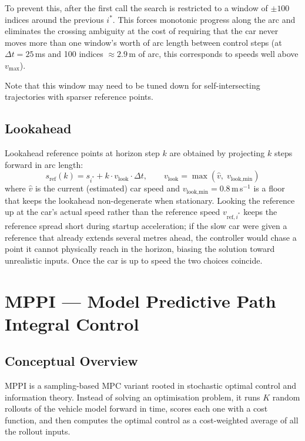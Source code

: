 \documentclass[11pt]{article}
\begin{document}
To prevent this, after the first call the search is restricted to a window of
$\pm 100$ indices around the previous $i^*$.  This forces monotonic progress
along the arc and eliminates the crossing ambiguity at the cost of requiring
that the car never moves more than one window's worth of arc length between
control steps (at $\Delta t = 25$\,ms and 100 indices $\approx 2.9$\,m of arc,
this corresponds to speeds well above $v_{\max}$).

Note that this window may need to be tuned down for self-intersecting trajectories with sparser reference points.

\subsection{Lookahead}

Lookahead reference points at horizon step $k$ are obtained by projecting $k$
steps forward in arc length:
\[
s_{\text{ref}}(k) = s_{i^*} + k \cdot v_{\text{look}} \cdot \Delta t,
\qquad
v_{\text{look}} = \max(\hat{v},\; v_{\text{look,min}})
\]
where $\hat{v}$ is the current (estimated) car speed and
$v_{\text{look,min}} = 0.8$\,m\,s$^{-1}$ is a floor that keeps the lookahead
non-degenerate when stationary.  Looking the reference up at the
car's actual speed rather than the reference speed
$v_{\text{ref},i^*}$ keeps the reference spread short during startup
acceleration; if the slow car were given a reference that already extends
several metres ahead, the controller would chase a point it cannot
physically reach in the horizon, biasing the solution toward unrealistic
inputs.  Once the car is up to speed the two choices coincide.


\section{MPPI --- Model Predictive Path Integral Control}

\subsection{Conceptual Overview}

MPPI is a sampling-based MPC variant rooted in
stochastic optimal control and information theory.  Instead of solving an
optimisation problem, it runs $K$ random rollouts of the vehicle model
forward in time, scores each one with a cost function, and then computes the
optimal control as a cost-weighted average of all the rollout inputs.
\end{document}
